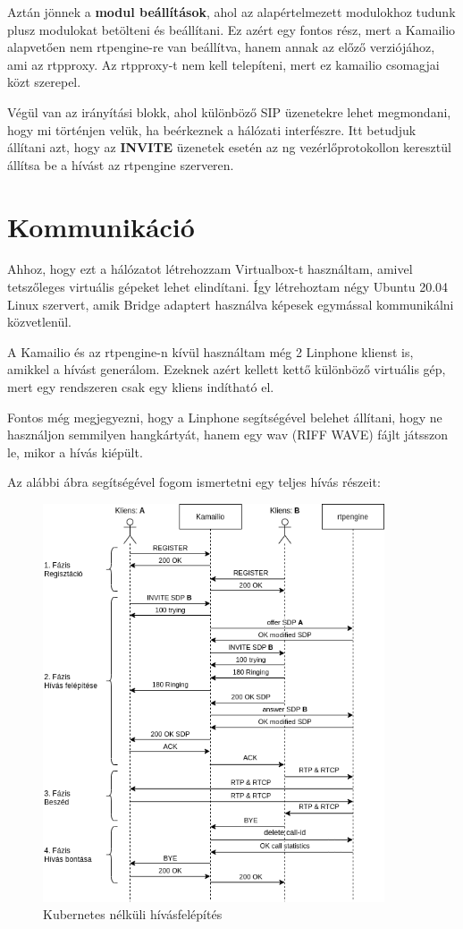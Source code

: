 Aztán jönnek a \textbf{modul beállítások}, ahol az alapértelmezett modulokhoz tudunk plusz
modulokat betölteni és beállítani. Ez azért egy fontos rész, mert a Kamailio alapvetően 
nem rtpengine-re van beállítva, hanem annak az előző verziójához, ami az rtpproxy. 
Az rtpproxy-t nem kell telepíteni, mert ez kamailio csomagjai közt szerepel. 

Végül van az irányítási blokk, ahol különböző SIP üzenetekre lehet megmondani, hogy mi
történjen velük, ha beérkeznek a hálózati interfészre. Itt betudjuk állítani azt, hogy
az \textbf{INVITE} üzenetek esetén az ng vezérlőprotokollon keresztül állítsa be a hívást
az rtpengine szerveren.

\section{Kommunikáció}

Ahhoz, hogy ezt a hálózatot létrehozzam Virtualbox-t használtam, amivel tetszőleges 
virtuális gépeket lehet elindítani. Így létrehoztam négy Ubuntu 20.04 Linux szervert, amik
Bridge adaptert használva képesek egymással kommunikálni közvetlenül. 

A Kamailio és az rtpengine-n kívül használtam még 2 Linphone klienst is, amikkel a hívást
generálom. Ezeknek azért kellett kettő különböző virtuális gép, mert egy rendszeren 
csak egy kliens indítható el.

Fontos még megjegyezni, hogy a Linphone segítségével belehet állítani, hogy ne használjon
semmilyen hangkártyát, hanem egy wav (RIFF WAVE) fájlt játsszon le, mikor a hívás kiépült.

Az alábbi ábra segítségével fogom ismertetni egy teljes hívás részeit:

\begin{figure}[!ht]
	\centering
	\includegraphics[width=0.9\textwidth, keepaspectratio]{figures/basic_call_flow.png}
	\caption{Kubernetes nélküli hívásfelépítés}
	\label{fig:HVSpaces}
\end{figure}

